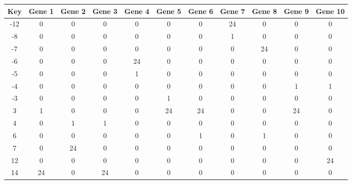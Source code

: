 \begin{tabular}{|c|c|c|c|c|c|c|c|c|c|c|}
\hline
Key & Gene 1 & Gene 2 & Gene 3 & Gene 4 & Gene 5 & Gene 6 & Gene 7 & Gene 8 & Gene 9 & Gene 10 \\
\hline
-12 & 0 & 0 & 0 & 0 & 0 & 0 & 24 & 0 & 0 & 0 \\
-8 & 0 & 0 & 0 & 0 & 0 & 0 & 1 & 0 & 0 & 0 \\
-7 & 0 & 0 & 0 & 0 & 0 & 0 & 0 & 24 & 0 & 0 \\
-6 & 0 & 0 & 0 & 24 & 0 & 0 & 0 & 0 & 0 & 0 \\
-5 & 0 & 0 & 0 & 1 & 0 & 0 & 0 & 0 & 0 & 0 \\
-4 & 0 & 0 & 0 & 0 & 0 & 0 & 0 & 0 & 1 & 1 \\
-3 & 0 & 0 & 0 & 0 & 1 & 0 & 0 & 0 & 0 & 0 \\
3 & 1 & 0 & 0 & 0 & 24 & 24 & 0 & 0 & 24 & 0 \\
4 & 0 & 1 & 1 & 0 & 0 & 0 & 0 & 0 & 0 & 0 \\
6 & 0 & 0 & 0 & 0 & 0 & 1 & 0 & 1 & 0 & 0 \\
7 & 0 & 24 & 0 & 0 & 0 & 0 & 0 & 0 & 0 & 0 \\
12 & 0 & 0 & 0 & 0 & 0 & 0 & 0 & 0 & 0 & 24 \\
14 & 24 & 0 & 24 & 0 & 0 & 0 & 0 & 0 & 0 & 0 \\
\hline
\end{tabular}